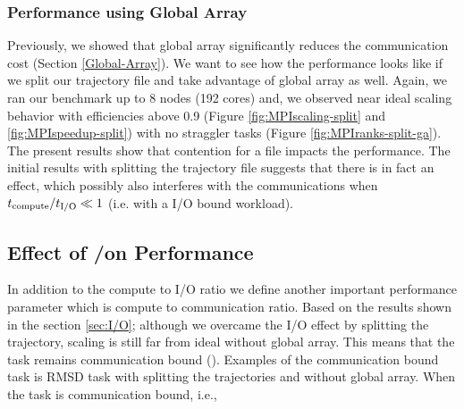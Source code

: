 \subsubsection*{Performance using Global Array}
Previously, we showed that global array significantly reduces the communication cost (Section \ref{Global-Array}). 
We want to see how the performance looks like if we split our trajectory file and take advantage of global array as well.
Again, we ran our benchmark up to 8 nodes (192 cores) and, we observed near ideal scaling behavior with efficiencies above 0.9 (Figure \ref{fig:MPIscaling-split} and \ref{fig:MPIspeedup-split}) with no straggler tasks (Figure \ref{fig:MPIranks-split-ga}).  
The present results show that contention for a file impacts the performance. 
The initial results with splitting the trajectory file suggests that there is in fact an effect, which possibly also interferes with the communications when ${t}_{\text{compute}}/{t}_{\text{I/O}} \ll 1$ (i.e. with a I/O bound workload).

\subsection{Effect of \tcomp/\tcomm on Performance}

In addition to the compute to I/O ratio we define another important performance parameter which is compute to communication ratio.
Based on the results shown in the section \ref{sec:I/O}; although we overcame the I/O effect by splitting the trajectory, scaling is still far from ideal without global array.
This means that the task remains communication bound (). 
Examples of the communication bound task is RMSD task with splitting the trajectories and without global array.
When the task is communication bound, i.e.,

